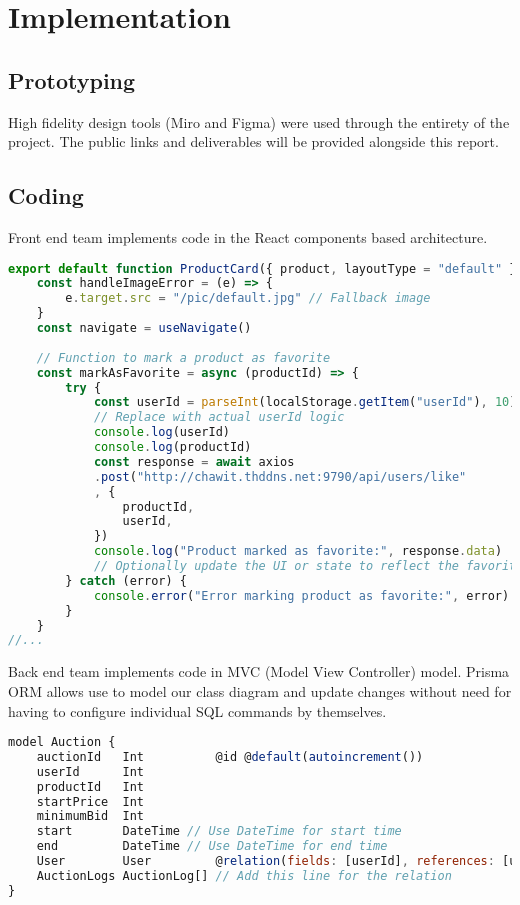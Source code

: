 %
%
\chapter{Implementation}

\section{Prototyping}

High fidelity design tools (Miro and Figma) were used through the entirety of the project. The public links and deliverables will be provided alongside this report.

\section{Coding}

Front end team implements code in the React components based architecture.

\begin{lstlisting}[language=JavaScript]
export default function ProductCard({ product, layoutType = "default" }) {
	const handleImageError = (e) => {
		e.target.src = "/pic/default.jpg" // Fallback image
	}
	const navigate = useNavigate()
	
	// Function to mark a product as favorite
	const markAsFavorite = async (productId) => {
		try {
			const userId = parseInt(localStorage.getItem("userId"), 10) 
			// Replace with actual userId logic
			console.log(userId)
			console.log(productId)
			const response = await axios
			.post("http://chawit.thddns.net:9790/api/users/like"
			, {
				productId,
				userId,
			})
			console.log("Product marked as favorite:", response.data)
			// Optionally update the UI or state to reflect the favorite status
		} catch (error) {
			console.error("Error marking product as favorite:", error)
		}
	}
//...
\end{lstlisting}


Back end team implements code in MVC (Model View Controller) model. Prisma ORM allows use to model our class diagram and update changes without need for having to configure individual SQL commands by themselves.

\begin{lstlisting}[language=JavaScript]
model Auction {
	auctionId   Int          @id @default(autoincrement())
	userId      Int
	productId   Int
	startPrice  Int
	minimumBid  Int
	start       DateTime // Use DateTime for start time
	end         DateTime // Use DateTime for end time
	User        User         @relation(fields: [userId], references: [userId])
	AuctionLogs AuctionLog[] // Add this line for the relation
}
\end{lstlisting}


